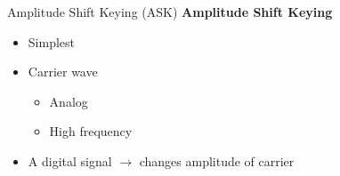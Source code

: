 \documentclass{beamer}
\begin{document}
	\begin{frame}{Amplitude Shift Keying (ASK)}
		\textbf{Amplitude Shift Keying}
		\begin{itemize}
			\onslide\item<1->Simplest
			\onslide\item<2->Carrier wave
			\begin{itemize}
				\item Analog
				\item High frequency
			\end{itemize}
			\onslide\item<3->A digital signal $\rightarrow$ changes amplitude of carrier
		\end{itemize}
	\end{frame}
	
\end{document}
